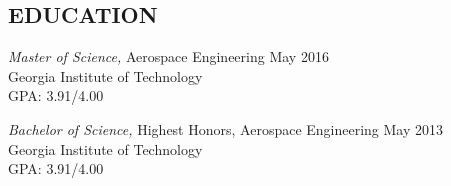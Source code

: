 \documentclass[margin]{res} %
\begin{document}
\begin{resume}
\section{EDUCATION}
{\sl Master of Science,} Aerospace Engineering \hfill May 2016 \\
Georgia Institute of Technology \\
GPA: 3.91/4.00

{\sl Bachelor of Science,} Highest Honors, Aerospace Engineering \hfill May 2013 \\
Georgia Institute of Technology \\
GPA: 3.91/4.00






\end{resume}
\end{document}
